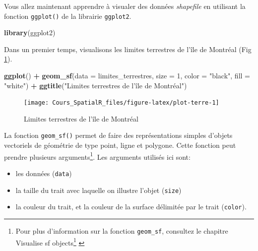 \documentclass[
  12pt,
]{krantz}
\newenvironment{Shaded}{\begin{snugshade}}{\end{snugshade}}
\newcommand{\DataTypeTok}[1]{\textcolor[rgb]{0.13,0.29,0.53}{#1}}
\newcommand{\DecValTok}[1]{\textcolor[rgb]{0.00,0.00,0.81}{#1}}
\newcommand{\KeywordTok}[1]{\textcolor[rgb]{0.13,0.29,0.53}{\textbf{#1}}}
\newcommand{\NormalTok}[1]{#1}
\newcommand{\OperatorTok}[1]{\textcolor[rgb]{0.81,0.36,0.00}{\textbf{#1}}}
\newcommand{\StringTok}[1]{\textcolor[rgb]{0.31,0.60,0.02}{#1}}
\providecommand{\tightlist}{%
  \setlength{\itemsep}{0pt}\setlength{\parskip}{0pt}}
\renewcommand{\href}[2]{#2\footnote{\url{#1}}}
\begin{document}
Vous allez maintenant apprendre à visualer des données \emph{shapefile} en utilisant la fonction \texttt{ggplot()} de la librairie \texttt{ggplot2}.

\begin{Shaded}
\begin{Highlighting}[]
\KeywordTok{library}\NormalTok{(ggplot2)}
\end{Highlighting}
\end{Shaded}

Dans un premier temps, visualisons les limites terrestres de l'île de Montréal (Fig \ref{fig:plot-terre}).

\begin{Shaded}
\begin{Highlighting}[]
\KeywordTok{ggplot}\NormalTok{() }\OperatorTok{+}
\KeywordTok{geom_sf}\NormalTok{(}\DataTypeTok{data =}\NormalTok{ limites_terrestres, }\DataTypeTok{size =} \DecValTok{1}\NormalTok{, }\DataTypeTok{color =} \StringTok{"black"}\NormalTok{, }\DataTypeTok{fill =} \StringTok{"white"}\NormalTok{) }\OperatorTok{+}
\KeywordTok{ggtitle}\NormalTok{(}\StringTok{"Limites terrestres de l'île de Montréal"}\NormalTok{)}
\end{Highlighting}
\end{Shaded}

\begin{figure}

{\centering \texttt{[image: Cours\_SpatialR\_files/figure-latex/plot-terre-1]} 

}

\caption{Limites terrestres de l'île de Montréal}\label{fig:plot-terre}
\end{figure}

La fonction \texttt{geom\_sf()} permet de faire des représentations simples d'objets vectoriels de géométrie de type point, ligne et polygone.
Cette fonction peut prendre plusieurs arguments\footnote{Pour plus d'information sur la fonction \texttt{geom\_sf}, consultez le chapitre \href{https://ggplot2.tidyverse.org/reference/ggsf.html}{Visualise sf objects} \citep{Wickham_ggplot2_2016}}. Les arguments utilisés ici sont:

\begin{itemize}
\tightlist
\item
  les données (\texttt{data})
\item
  la taille du trait avec laquelle on illustre l'objet (\texttt{size})
\item
  la couleur du trait, et la couleur de la surface délimitée par le trait (\texttt{color}).
\end{itemize}
\end{document}
